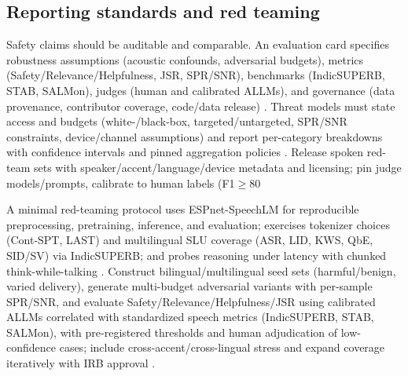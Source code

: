 \documentclass{article}
\begin{document}
\subsection{Reporting standards and red teaming} \label{subsec:reportingstandardsandredteaming}
Safety claims should be auditable and comparable. An evaluation card specifies robustness assumptions (acoustic confounds, adversarial budgets), metrics (Safety/Relevance/Helpfulness, JSR, SPR/SNR), benchmarks (IndicSUPERB, STAB, SALMon), judges (human and calibrated ALLMs), and governance (data provenance, contributor coverage, code/data release) \cite{vashishth2024stabspeechtokenizerassessmentbenchmark,entry2025indicsuperbspeechprocessinguniversalperf,maimon2025salmonsuiteacousticlanguagemodelevaluati}. Threat models must state access and budgets (white-/black-box, targeted/untargeted, SPR/SNR constraints, device/channel assumptions) and report per-category breakdowns with confidence intervals and pinned aggregation policies \cite{peri2024speechguardexploringadversarialrobustnes}. Release spoken red-team sets with speaker/accent/language/device metadata and licensing; pin judge models/prompts, calibrate to human labels (F1$\geq$80%

A minimal red-teaming protocol uses ESPnet-SpeechLM for reproducible preprocessing, pretraining, inference, and evaluation; exercises tokenizer choices (Cont-SPT, LAST) and multilingual SLU coverage (ASR, LID, KWS, QbE, SID/SV) via IndicSUPERB; and probes reasoning under latency with chunked think-while-talking \cite{tian2025espnetspeechlmopenspeechlanguagemodeltoo,li2025continuousspeechtokenizertext,turetzky2024lastlanguagemodelawarespeechtokenization,entry2025indicsuperbspeechprocessinguniversalperf,chiang2025stitchsimultaneousthinkingtalkingchunked}. Construct bilingual/multilingual seed sets (harmful/benign, varied delivery), generate multi-budget adversarial variants with per-sample SPR/SNR, and evaluate Safety/Relevance/Helpfulness/JSR using calibrated ALLMs correlated with standardized speech metrics (IndicSUPERB, STAB, SALMon), with pre-registered thresholds and human adjudication of low-confidence cases; include cross-accent/cross-lingual stress and expand coverage iteratively with IRB approval \cite{peri2024speechguardexploringadversarialrobustnes,vashishth2024stabspeechtokenizerassessmentbenchmark,maimon2025salmonsuiteacousticlanguagemodelevaluati,fu2025personalizedsociallyassistiverobotsendsp}.
\end{document}
